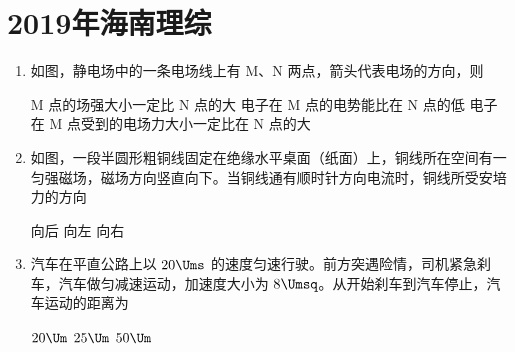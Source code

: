 \documentclass[\gkver]{gaokaozhenti}
\begin{document}
\chapter{2019年海南理综}

\begin{enumerate}
\item
如图，静电场中的一条电场线上有 M、N 两点，箭头代表电场的方向，则

\onepicture[w=4.48cm]{}

{M 点的场强大小一定比 N 点的大}
{电子在 M 点的电势能比在 N 点的低}
{电子在 M 点受到的电场力大小一定比在 N 点的大}


\item
如图，一段半圆形粗铜线固定在绝缘水平桌面（纸面）上，铜线所在空间有一匀强磁场，磁场方向竖直向下。当铜线通有顺时针方向电流时，铜线所受安培力的方向


{向后}
{向左}
{向右}


\item
汽车在平直公路上以 $20\Ums$ 的速度匀速行驶。前方突遇险情，司机紧急刹车，汽车做匀减速运动，加速度大小为 $8\Umsq$。从开始刹车到汽车停止，汽车运动的距离为

\fourchoices[answer=C]
{$10\Um$}
{$20\Um$}
{$25\Um$}
{$50\Um$}


\end{enumerate}
\end{document}
